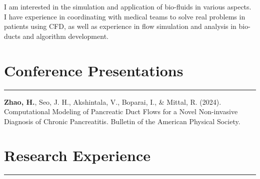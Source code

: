 \documentclass[10pt]{article} %
\begin{document}
I am interested in the simulation and application of bio-fluids in various aspects. I have experience in coordinating with medical teams to solve real problems in patients using CFD, as well as experience in flow simulation and analysis in bio-ducts and algorithm development.



\section*{Conference Presentations}
\hrule

\textbf{Zhao, H.}, Seo, J. H., Akshintala, V., Boparai, I., \& Mittal, R. (2024). Computational Modeling of Pancreatic Duct Flows for a Novel Non-invasive Diagnosis of Chronic Pancreatitis. Bulletin of the American Physical Society.



\vspace{2mm}

\section*{Research Experience}
\hrule
\end{document}
